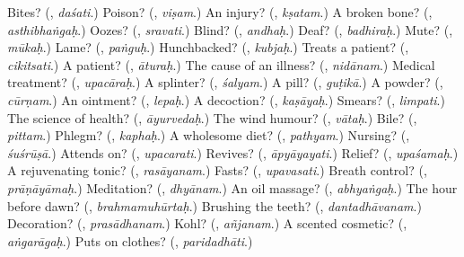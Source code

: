 \begin{tcolorbox}[breakable,colback=teal!4,colframe=teal!35!black,title={Before you move on}]
Bites? (\textbf{}, \emph{daśati}.) Poison? (\textbf{}, \emph{viṣam}.) An injury? (\textbf{}, \emph{kṣatam}.) A broken bone? (\textbf{}, \emph{asthibhaṅgaḥ}.) Oozes? (\textbf{}, \emph{sravati}.) Blind? (\textbf{}, \emph{andhaḥ}.) Deaf? (\textbf{}, \emph{badhiraḥ}.) Mute? (\textbf{}, \emph{mūkaḥ}.) Lame? (\textbf{}, \emph{paṅguḥ}.) Hunchbacked? (\textbf{}, \emph{kubjaḥ}.) Treats a patient? (\textbf{}, \emph{cikitsati}.) A patient? (\textbf{}, \emph{āturaḥ}.) The cause of an illness? (\textbf{}, \emph{nidānam}.) Medical treatment? (\textbf{}, \emph{upacāraḥ}.) A splinter? (\textbf{}, \emph{śalyam}.) A pill? (\textbf{}, \emph{guṭikā}.) A powder? (\textbf{}, \emph{cūrṇam}.) An ointment? (\textbf{}, \emph{lepaḥ}.) A decoction? (\textbf{}, \emph{kaṣāyaḥ}.) Smears? (\textbf{}, \emph{limpati}.) The science of health? (\textbf{}, \emph{āyurvedaḥ}.) The wind humour? (\textbf{}, \emph{vātaḥ}.) Bile? (\textbf{}, \emph{pittam}.) Phlegm? (\textbf{}, \emph{kaphaḥ}.) A wholesome diet? (\textbf{}, \emph{pathyam}.) Nursing? (\textbf{}, \emph{śuśrūṣā}.) Attends on? (\textbf{}, \emph{upacarati}.) Revives? (\textbf{}, \emph{āpyāyayati}.) Relief? (\textbf{}, \emph{upaśamaḥ}.) A rejuvenating tonic? (\textbf{}, \emph{rasāyanam}.) Fasts? (\textbf{}, \emph{upavasati}.) Breath control? (\textbf{}, \emph{prāṇāyāmaḥ}.) Meditation? (\textbf{}, \emph{dhyānam}.) An oil massage? (\textbf{}, \emph{abhyaṅgaḥ}.) The hour before dawn? (\textbf{}, \emph{brahmamuhūrtaḥ}.) Brushing the teeth? (\textbf{}, \emph{dantadhāvanam}.) Decoration? (\textbf{}, \emph{prasādhanam}.) Kohl? (\textbf{}, \emph{añjanam}.) A scented cosmetic? (\textbf{}, \emph{aṅgarāgaḥ}.) Puts on clothes? (\textbf{}, \emph{paridadhāti}.)
\end{tcolorbox}
